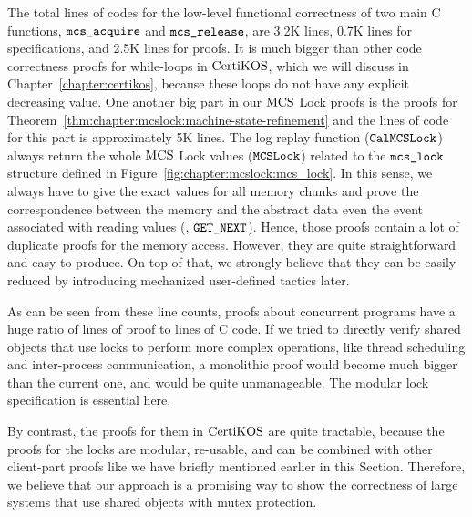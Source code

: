 The total lines of codes for the low-level functional correctness
of two main C functions, ${\mathrm{\texttt{mcs\_acquire}}}$ and ${\mathrm{\texttt{mcs\_release}}}$, are 3.2K lines,  
0.7K lines for specifications, and 2.5K lines for proofs.
It is much bigger than other code correctness proofs for while-loops in $\mathrm{CertiKOS}$, which we will
discuss in Chapter~\ref{chapter:certikos},
because these loops do not have any explicit decreasing value.
One another big part in our $\mathrm{MCS}$ Lock proofs is the proofs for 
Theorem~\ref{thm:chapter:mcslock:machine-state-refinement} and the lines of code for this part is 
approximately 5K lines. The log replay function (${\mathrm{\texttt{CalMCSLock}}}$) always 
return the whole $\mathrm{MCS}$ Lock values (${\mathrm{\texttt{MCSLock}}}$) related 
to the  ${\mathrm{\texttt{mcs\_lock}}}$ structure defined in Figure~\ref{fig:chapter:mcslock:mcs_lock}. 
In this sense, we always have to give the exact values for all memory 
chunks and prove the correspondence between the memory and the abstract 
data even the event associated with reading values (\eg, ${\mathrm{\texttt{GET\_NEXT}}}$).
Hence, those proofs contain a lot of duplicate proofs for the memory access. 
However, they are quite straightforward and easy to produce. 
On top of that, we strongly believe 
that they can be easily reduced by introducing mechanized user-defined tactics later. 

As can be seen from these line counts, proofs about concurrent programs
have a huge ratio of lines of proof to lines of C code.
If we tried to directly verify shared objects that use locks to 
perform more complex operations, like thread scheduling
and inter-process communication, a monolithic proof  
would become much bigger than the current one, and would be quite
unmanageable. The modular lock specification is essential here.

By contrast, the proofs for them in $\mathrm{CertiKOS}$ are quite tractable, 
because the proofs for the locks are modular, re-usable, and can 
be combined with other client-part proofs like we have briefly 
mentioned earlier in this Section.
Therefore, we believe that our approach is a promising way to 
show the correctness of large systems that use shared objects with mutex protection. 

